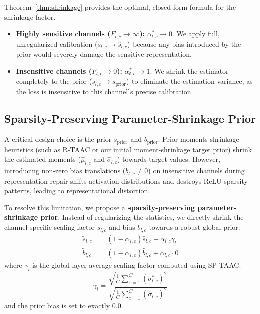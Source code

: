 \documentclass{article}
\theoremstyle{plain}
\theoremstyle{definition}
\theoremstyle{remark}
\begin{document}
Theorem~\ref{thm:shrinkage} provides the optimal, closed-form formula for the shrinkage factor.
\begin{itemize}
    \item \textbf{Highly sensitive channels ($F_{l,c} \to \infty$):} $\alpha_{l,c}^* \to 0$. We apply full, unregularized calibration ($\tilde{s}_{l,c} \to \hat{s}_{l,c}$) because any bias introduced by the prior would severely damage the sensitive representation.
    \item \textbf{Insensitive channels ($F_{l,c} \to 0$):} $\alpha_{l,c}^* \to 1$. We shrink the estimator completely to the prior ($\tilde{s}_{l,c} \to s_{\text{prior}}$) to eliminate the estimation variance, as the loss is insensitive to this channel's precise calibration.
\end{itemize}

\subsection{Sparsity-Preserving Parameter-Shrinkage Prior}

A critical design choice is the prior $s_{\text{prior}}$ and $b_{\text{prior}}$. Prior moments-shrinkage heuristics (such as R-TAAC or our initial moment-shrinkage target prior) shrink the estimated moments ($\hat{\mu}_{l,c}$ and $\hat{\sigma}_{l,c}$) towards target values. However, introducing non-zero bias translations ($b_{l,c} \ne 0$) on insensitive channels during representation repair shifts activation distributions and destroys ReLU sparsity patterns, leading to representational distortion.

To resolve this limitation, we propose a \textbf{sparsity-preserving parameter-shrinkage prior}. Instead of regularizing the statistics, we directly shrink the channel-specific scaling factor $s_{l,c}$ and bias $b_{l,c}$ towards a robust global prior:
\begin{align}
    \tilde{s}_{l,c} &= (1 - \alpha_{l,c})\hat{s}_{l,c} + \alpha_{l,c} \gamma_l \\
    \tilde{b}_{l,c} &= (1 - \alpha_{l,c})\hat{b}_{l,c} + \alpha_{l,c} \cdot 0
\end{align}
where $\gamma_l$ is the global layer-average scaling factor computed using SP-TAAC:
\begin{equation}
    \gamma_l = \frac{\sqrt{\frac{1}{C}\sum_{c=1}^C (\sigma^*_{l,c})^2}}{\sqrt{\frac{1}{C}\sum_{c=1}^C (\hat{\sigma}_{l,c})^2}}
\end{equation}
and the prior bias is set to exactly $0.0$.
\end{document}
